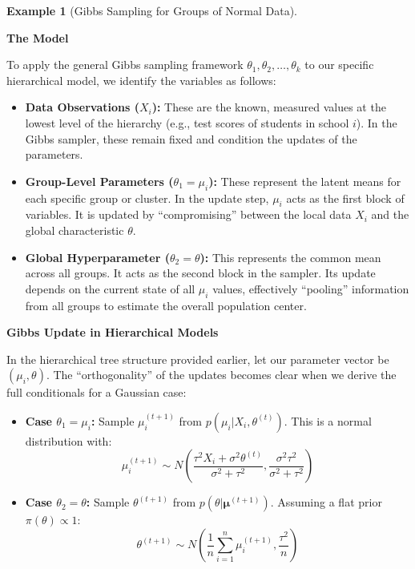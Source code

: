 \documentclass[
  letterpaper,
  DIV=11,
  numbers=noendperiod]{scrreprt}
\renewcommand{\[}{\begin{equation}}
\renewcommand{\]}{\end{equation}}
\theoremstyle{definition}
\theoremstyle{plain}
\theoremstyle{plain}
\theoremstyle{plain}
\theoremstyle{definition}
\newtheorem{example}{Example}[chapter]
\theoremstyle{plain}
\theoremstyle{remark}
\begin{document}
\begin{example}[Gibbs Sampling for Groups of Normal
Data]\protect\hypertarget{exm-hierarchical-gibbs}{}\label{exm-hierarchical-gibbs}

\textbf{The Model}

To apply the general Gibbs sampling framework
\(\theta_1, \theta_2, \dots, \theta_k\) to our specific hierarchical
model, we identify the variables as follows:

\begin{itemize}
\item
  \textbf{Data Observations (\(X_i\)):} These are the known, measured
  values at the lowest level of the hierarchy (e.g., test scores of
  students in school \(i\)). In the Gibbs sampler, these remain fixed
  and condition the updates of the parameters.
\item
  \textbf{Group-Level Parameters (\(\theta_1 = \mu_i\)):} These
  represent the latent means for each specific group or cluster. In the
  update step, \(\mu_i\) acts as the first block of variables. It is
  updated by ``compromising'' between the local data \(X_i\) and the
  global characteristic \(\theta\).
\item
  \textbf{Global Hyperparameter (\(\theta_2 = \theta\)):} This
  represents the common mean across all groups. It acts as the second
  block in the sampler. Its update depends on the current state of all
  \(\mu_i\) values, effectively ``pooling'' information from all groups
  to estimate the overall population center.
\end{itemize}

\textbf{Gibbs Update in Hierarchical Models}

In the hierarchical tree structure provided earlier, let our parameter
vector be \((\mu_i, \theta)\). The ``orthogonality'' of the updates
becomes clear when we derive the full conditionals for a Gaussian case:

\begin{itemize}
\item
  \textbf{Case \(\theta_1 = \mu_i\):} Sample \(\mu_i^{(t+1)}\) from
  \(p(\mu_i | X_i, \theta^{(t)})\). This is a normal distribution with:
  \[
  \mu_i^{(t+1)} \sim N\left( \frac{\tau^2 X_i + \sigma^2 \theta^{(t)}}{\sigma^2 + \tau^2}, \frac{\sigma^2 \tau^2}{\sigma^2 + \tau^2} \right)
  \]
\item
  \textbf{Case \(\theta_2 = \theta\):} Sample \(\theta^{(t+1)}\) from
  \(p(\theta | \boldsymbol{\mu}^{(t+1)})\). Assuming a flat prior
  \(\pi(\theta) \propto 1\): \[
  \theta^{(t+1)} \sim N\left( \frac{1}{n} \sum_{i=1}^n \mu_i^{(t+1)}, \frac{\tau^2}{n} \right)
  \]
\end{itemize}

\end{example}
\end{document}
